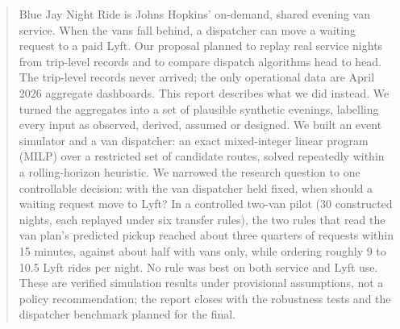 \documentclass{article}
\begin{document}

\printAffiliationsAndNotice{}


\begin{abstract}
Blue Jay Night Ride is Johns Hopkins' on-demand, shared evening van service. When the vans fall behind, a dispatcher can move a waiting request to a paid Lyft. Our proposal planned to replay real service nights from trip-level records and to compare dispatch algorithms head to head. The trip-level records never arrived; the only operational data are April 2026 aggregate dashboards. This report describes what we did instead. We turned the aggregates into a set of plausible synthetic evenings, labelling every input as observed, derived, assumed or designed. We built an event simulator and a van dispatcher: an exact mixed-integer linear program (MILP) over a restricted set of candidate routes, solved repeatedly within a rolling-horizon heuristic. We narrowed the research question to one controllable decision: with the van dispatcher held fixed, when should a waiting request move to Lyft? In a controlled two-van pilot (30 constructed nights, each replayed under six transfer rules), the two rules that read the van plan's predicted pickup reached about three quarters of requests within 15 minutes, against about half with vans only, while ordering roughly 9 to 10.5 Lyft rides per night. No rule was best on both service and Lyft use. These are verified simulation results under provisional assumptions, not a policy recommendation; the report closes with the robustness tests and the dispatcher benchmark planned for the final.
\end{abstract}
\end{document}
